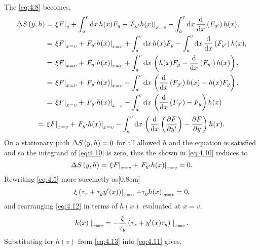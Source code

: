 The \gd\; \eqref{eq:4.8} becomes,
\begin{equation*}
\begin{split}
	\Delta S\left(y,h\right) &= \left. \xi F \right|_v + \int_{a}^{v}\mathrm{d} x\, h(x)F_y + \left. F_{y^\prime} h(x)\right|_{x=v}- \int_{a}^{v}\mathrm{d} x\,\frac{\mathrm{d}}{\mathrm{d}x}\left(F_{y^\prime}\right) h(x),\\
&= \left. \xi F \right|_{x=v} + \left. F_{y^\prime} h(x)\right|_{x=v}+ \int_{a}^{v}\mathrm{d} x\, h(x)F_y - \int_{a}^{v}\mathrm{d} x\,\frac{\mathrm{d}}{\mathrm{d}x}\left(F_{y^\prime}\right) h(x),\\
&= \left. \xi F \right|_{x=v} + \left. F_{y^\prime} h(x)\right|_{x=v}+ \int_{a}^{v}\mathrm{d} x\, \left(h(x)F_y - \frac{\mathrm{d}}{\mathrm{d}x}\left(F_{y^\prime}\right) h(x)\right),\\
&= \left. \xi F \right|_{x=v} + \left. F_{y^\prime} h(x)\right|_{x=v}- \int_{a}^{v}\mathrm{d} x\, \left(\frac{\mathrm{d}}{\mathrm{d}x}\left(F_{y^\prime}\right) h(x) - h(x)F_y\right),\\
&= \left. \xi F \right|_{x=v} + \left. F_{y^\prime} h(x)\right|_{x=v}- \int_{a}^{v}\mathrm{d} x\, \left(\frac{\mathrm{d}}{\mathrm{d}x}\left(F_{y^\prime}\right) - F_y\right) h(x)
\end{split}
\end{equation*}
\begin{equation}
\label{eq:4.10}
= \left. \xi F \right|_{x=v} + \left. F_{y^\prime} h(x)\right|_{x=v}- \int_{a}^{v}\mathrm{d} x\, \left(\frac{\mathrm{d}}{\mathrm{d}x}\left(\frac{\partial F}{\partial y^\prime}\right) - \frac{\partial F}{\partial y}\right) h(x).
\end{equation}
On a stationary path $\Delta S\left(y,h\right)=0$ for all allowed $h$ and the \el equation is satisfied and so the integrand of \eqref{eq:4.10} is zero, thus the \gd\;shown in \eqref{eq:4.10} reduces to
\begin{equation}
\label{eq:4.11}
\Delta S\left(y,h\right) = \left. \xi F \right|_{x=v} + \left. F_{y^\prime} h(x)\right|_{x=v} = 0.
\end{equation}
Rewriting \eqref{eq:4.5} more succinctly as[0.8cm]
\begin{equation}
	\label{eq:4.12}
	\left.\xi\left(\tau_x + \tau_y y^\prime(x)\right)\right|_{x=v}\left. + \tau_y h(x)\right|_{x=v} = 0,
\end{equation}
and rearranging \eqref{eq:4.12} in terms of $h(x)$ evaluated at $x=v$,
\begin{equation}
	\label{eq:4.13}
	h(x)\left.\right|_{x=v} = -\frac{\xi}{\tau_y}\left(\tau_x +y^\prime(x)\tau_y\right)\left.\right|_{x=v}.
\end{equation}
Substituting for $h(v)$ from \eqref{eq:4.13} into \eqref{eq:4.11} gives,
